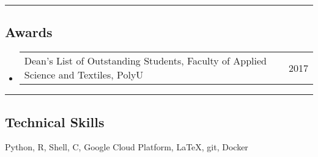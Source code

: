 \documentclass[10pt,letterpaper]{article}
\makeatletter
\newenvironment{indentsection}[1]%
{\begin{list}{}%
	{\setlength{\leftmargin}{#1}}%
	\item[]%
}
{\end{list}}
\newcommand{\headerrow}[2]
{\begin{tabular*}{\linewidth}{l@{\extracolsep{\fill}}r}
	#1 &
	#2 \\
\end{tabular*}}
\newcommand{\CPP}
{C\nolinebreak[4]\hspace{-.05em}\raisebox{.22ex}{\footnotesize\bf ++}}
\makeatother
\begin{document}




	



\hrule
\vspace{-1em}
\subsection*{Awards}

\begin{itemize}
	\parskip=0.1em
		\item
		\headerrow
			{Dean’s List of Outstanding Students, Faculty of Applied Science and Textiles, PolyU}
			{2017}



\end{itemize}



\hrule
\vspace{-1em}
\subsection*{Technical Skills}

\begin{indentsection}{\parindent}
\begin{description*}
	\item {Python, R, Shell, \CPP, Google Cloud Platform, \LaTeX, git, Docker}


\end{description*}
\end{indentsection}
\end{document}
